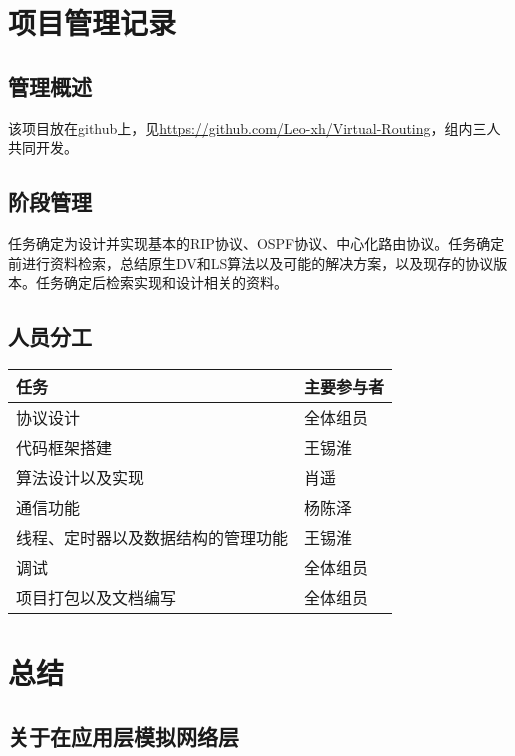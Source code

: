 \documentclass[15pt]{ctexart}
\begin{document}
\section{项目管理记录} %
\label{sec:项目管理记录}
	\subsection{管理概述} %
	\label{sub:管理概述}
		该项目放在github上，见\url{https://github.com/Leo-xh/Virtual-Routing}，组内三人共同开发。
	\subsection{阶段管理} %
	\label{sub:阶段管理}
		任务确定为设计并实现基本的RIP协议、OSPF协议、中心化路由协议。任务确定前进行资料检索，总结原生DV和LS算法以及可能的解决方案，以及现存的协议版本。任务确定后检索实现和设计相关的资料。
	\subsection{人员分工} %
	\label{sub:人员分工}
		\begin{table}[H]
			\centering
			\begin{tabular}{|l|l|}
				\hline
				任务 & 主要参与者 \\
				\hline
				协议设计 & 全体组员 \\
				\hline
				代码框架搭建 & 王锡淮 \\
				\hline
				算法设计以及实现 & 肖遥 \\
				\hline
				通信功能 & 杨陈泽 \\
				\hline
				线程、定时器以及数据结构的管理功能 & 王锡淮\\
				\hline 
				调试 & 全体组员 \\
				\hline
				项目打包以及文档编写 & 全体组员\\
				\hline
			\end{tabular}
		\end{table}

\section{总结} %
\label{sec:总结}
	\subsection{关于在应用层模拟网络层} %
	\label{sub:关于在应用层模拟网络层协议}
	
\end{document}
